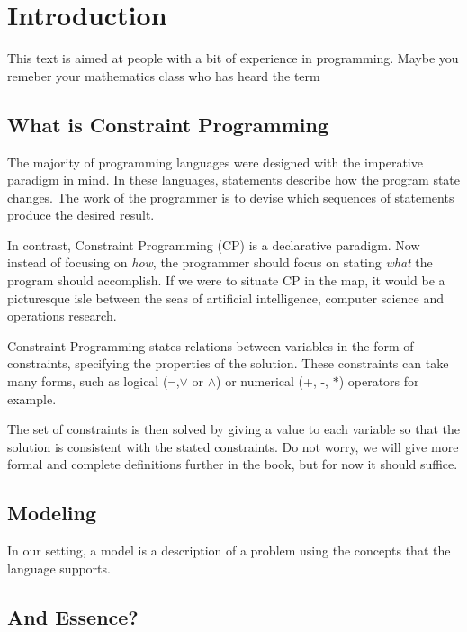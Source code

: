 \section{Introduction}

This text is aimed at people with a bit of experience in programming. Maybe you
remeber your mathematics class  who has heard the term

\subsection{What is Constraint Programming}

The majority of programming languages were designed with the imperative paradigm
in mind. In these languages, statements describe how the program state changes.
The work of the programmer is to devise which sequences of statements produce the
desired result.

In contrast, Constraint Programming (CP) is a declarative paradigm. Now instead
of focusing on \emph{how}, the programmer should focus on stating \emph{what} the program
should accomplish. If we were to situate CP in the map, it would be a picturesque 
isle between the seas of artificial intelligence, computer science and
operations research.

Constraint Programming states relations between variables in the form of
constraints, specifying the properties of the solution. These constraints can
take many forms, such as logical ($\neg$,$\vee$ or $\wedge$) or numerical (+,
-, $*$) operators for example.

The set of constraints is then solved by giving a value to each variable so
that the solution is consistent with the stated constraints.  Do not worry, we
will give more formal and complete definitions further in the book, but for now it
should suffice.

\subsection{Modeling}

In our setting, a model is a description of a problem using the concepts that the
language supports.

\subsection{And Essence?}
